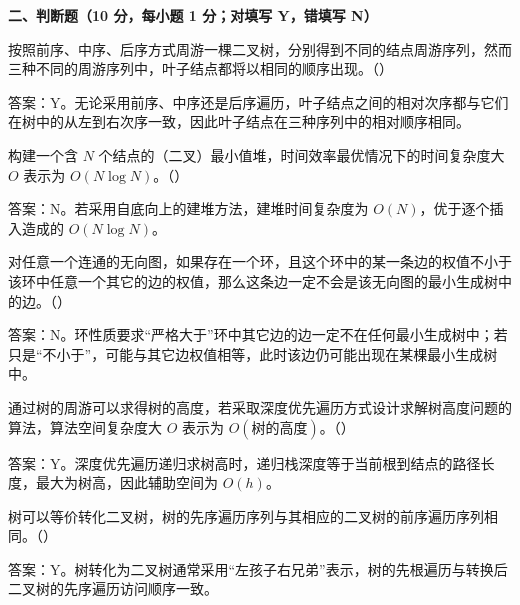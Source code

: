 \textbf{二、判断题（10 分，每小题 1 分；对填写 Y，错填写 N）}

\begin{question}
按照前序、中序、后序方式周游一棵二叉树，分别得到不同的结点周游序列，然而三种不同的周游序列中，叶子结点都将以相同的顺序出现。（\quad）
\begin{solution}
答案：Y。无论采用前序、中序还是后序遍历，叶子结点之间的相对次序都与它们在树中的从左到右次序一致，因此叶子结点在三种序列中的相对顺序相同。
\end{solution}
\end{question}

\begin{question}
构建一个含 $N$ 个结点的（二叉）最小值堆，时间效率最优情况下的时间复杂度大 $O$ 表示为 $O(N\log N)$。（\quad）
\begin{solution}
答案：N。若采用自底向上的建堆方法，建堆时间复杂度为 $O(N)$，优于逐个插入造成的 $O(N\log N)$。
\end{solution}
\end{question}

\begin{question}
对任意一个连通的无向图，如果存在一个环，且这个环中的某一条边的权值不小于该环中任意一个其它的边的权值，那么这条边一定不会是该无向图的最小生成树中的边。（\quad）
\begin{solution}
答案：N。环性质要求“严格大于”环中其它边的边一定不在任何最小生成树中；若只是“不小于”，可能与其它边权值相等，此时该边仍可能出现在某棵最小生成树中。
\end{solution}
\end{question}

\begin{question}
通过树的周游可以求得树的高度，若采取深度优先遍历方式设计求解树高度问题的算法，算法空间复杂度大 $O$ 表示为 $O(\text{树的高度})$。（\quad）
\begin{solution}
答案：Y。深度优先遍历递归求树高时，递归栈深度等于当前根到结点的路径长度，最大为树高，因此辅助空间为 $O(h)$。
\end{solution}
\end{question}

\begin{question}
树可以等价转化二叉树，树的先序遍历序列与其相应的二叉树的前序遍历序列相同。（\quad）
\begin{solution}
答案：Y。树转化为二叉树通常采用“左孩子右兄弟”表示，树的先根遍历与转换后二叉树的先序遍历访问顺序一致。
\end{solution}
\end{question}

